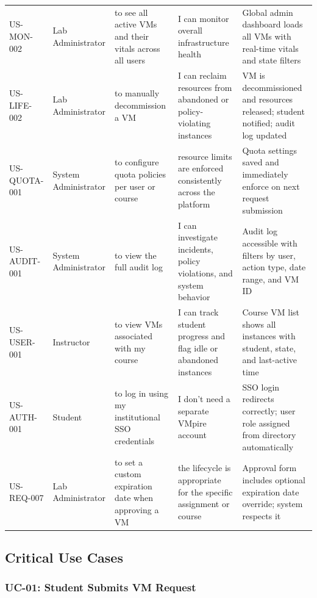 \documentclass[12pt,letterpaper]{article}
\begin{document}
\begin{longtable}{L{2.2cm} L{2.5cm} L{3.5cm} L{3cm} L{3.3cm}}
  \addlinespace
  US-MON-002 & Lab Administrator & to see all active VMs and their vitals across all users & I can monitor overall infrastructure health & Global admin dashboard loads all VMs with real-time vitals and state filters \\
  \addlinespace
  US-LIFE-002 & Lab Administrator & to manually decommission a VM & I can reclaim resources from abandoned or policy-violating instances & VM is decommissioned and resources released; student notified; audit log updated \\
  \addlinespace
  US-QUOTA-001 & System Administrator & to configure quota policies per user or course & resource limits are enforced consistently across the platform & Quota settings saved and immediately enforce on next request submission \\
  \addlinespace
  US-AUDIT-001 & System Administrator & to view the full audit log & I can investigate incidents, policy violations, and system behavior & Audit log accessible with filters by user, action type, date range, and VM ID \\
  \addlinespace
  US-USER-001 & Instructor & to view VMs associated with my course & I can track student progress and flag idle or abandoned instances & Course VM list shows all instances with student, state, and last-active time \\
  \addlinespace
  US-AUTH-001 & Student & to log in using my institutional SSO credentials & I don't need a separate VMpire account & SSO login redirects correctly; user role assigned from directory automatically \\
  \addlinespace
  US-REQ-007 & Lab Administrator & to set a custom expiration date when approving a VM & the lifecycle is appropriate for the specific assignment or course & Approval form includes optional expiration date override; system respects it \\
\end{longtable}

\subsection{Critical Use Cases}

\subsubsection*{UC-01: Student Submits VM Request}
\end{document}
